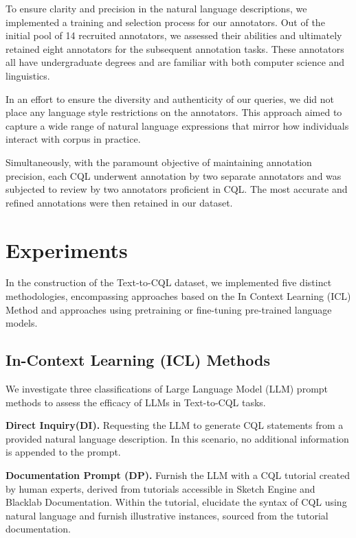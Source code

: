 \documentclass[11pt]{article}
\begin{document}
\begin{CJK*}{UTF8}{gbsn}
To ensure clarity and precision in the natural language descriptions, we implemented a training and selection process for our annotators. Out of the initial pool of 14 recruited annotators, we assessed their abilities and ultimately retained eight annotators for the subsequent annotation tasks. These annotators all have undergraduate degrees and are familiar with both computer science and linguistics.

In an effort to ensure the diversity and authenticity of our queries, we did not place any language style restrictions on the annotators. This approach aimed to capture a wide range of natural language expressions that mirror how individuals interact with corpus in practice.

Simultaneously, with the paramount objective of maintaining annotation precision, each CQL underwent annotation by two separate annotators and was subjected to review by two annotators proficient in CQL. The most accurate and refined annotations were then retained in our dataset.

\section{Experiments}
In the construction of the Text-to-CQL dataset, we implemented five distinct methodologies, encompassing approaches based on the In Context Learning (ICL) Method and approaches using pretraining or fine-tuning pre-trained language models.

\subsection{In-Context Learning (ICL) Methods}

We  investigate three classifications of Large Language Model (LLM) prompt methods to assess the efficacy of LLMs in Text-to-CQL tasks.

\textbf{Direct Inquiry(DI).} 
Requesting the LLM to generate CQL statements from a provided natural language description. In this scenario, no additional information is appended to the prompt.  

\textbf{Documentation Prompt (DP).} Furnish the LLM with a CQL tutorial created by human experts, derived from tutorials accessible in Sketch Engine\citep{sketchengine1,sketchengine2} and Blacklab\citep{blacklab} Documentation. Within the tutorial, elucidate the syntax of CQL using natural language and furnish illustrative instances, sourced from the tutorial documentation.


\end{CJK*}
\end{document}
